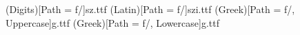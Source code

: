 \usepackage{mathspec}

\setmainfont[
	Path = f/,
	BoldFont=szb.ttf,
	ItalicFont=szi.ttf,
	BoldItalicFont=szbi.ttf
		]{sz.ttf}
		
\setmathfont(Digits)[Path = f/]{sz.ttf}
\setmathfont(Latin)[Path = f/]{szi.ttf}
\setmathfont(Greek)[Path = f/, Uppercase]{g.ttf}
\setmathfont(Greek)[Path = f/, Lowercase]{g.ttf}

\setmonofont[Path = f/]{pmono.ttf}

